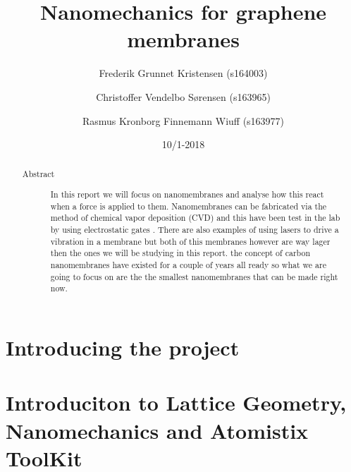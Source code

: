 \documentclass[aps, prl, a4paper, english, 12pt, twocolumn, nofootinbib]{revtex4-1}
\begin{document}
\begin{abstract}
 \begin{description}
  \item[Abstract] In this report we will focus on nanomembranes and analyse how this react when a force is applied to them. Nanomembranes can be fabricated via the method of chemical vapor deposition (CVD) and this have been test in the lab by using electrostatic gates \cite{Zande2010}. There are also examples of using lasers to drive a vibration in a membrane \cite{Davidovikj2016} but both of this membranes however are way lager then the ones we will be studying in this report. the concept of carbon nanomembranes have existed for a couple of years all ready so what we are going to focus on are the the smallest nanomembranes that can be made right now.
 \end{description}
\end{abstract}

\title{Nanomechanics for graphene membranes}
\date{10/1-2018}
\author{Frederik Grunnet Kristensen (s164003)}
\author{Christoffer Vendelbo Sørensen (s163965)}
\author{Rasmus Kronborg Finnemann Wiuff (s163977)}

\maketitle


\tableofcontents
\thispagestyle{empty}
\newpage
\setcounter{page}{1}

\section{Introducing the project}

\section{Introduciton to Lattice Geometry, Nanomechanics and Atomistix ToolKit}





\newpage



\newpage
\listoffigures
\listoftables
\listoflistings
\onecolumngrid
\newpage

\end{document}
